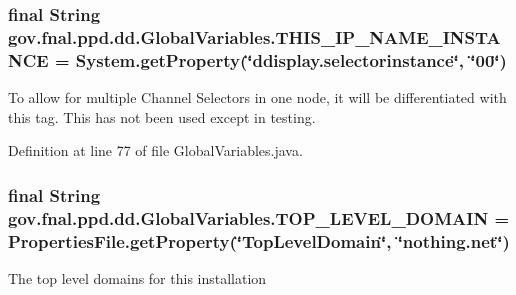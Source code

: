 \hypertarget{classgov_1_1fnal_1_1ppd_1_1dd_1_1GlobalVariables_ae5fe9c75fedaa742e5f68baad8768d7f}{
\subsubsection[{T\-H\-I\-S\-\_\-\-I\-P\-\_\-\-N\-A\-M\-E\-\_\-\-I\-N\-S\-T\-A\-N\-C\-E}]{\setlength{\rightskip}{0pt plus 5cm}final String gov.\-fnal.\-ppd.\-dd.\-Global\-Variables.\-T\-H\-I\-S\-\_\-\-I\-P\-\_\-\-N\-A\-M\-E\-\_\-\-I\-N\-S\-T\-A\-N\-C\-E = System.\-get\-Property(\char`\"{}ddisplay.\-selectorinstance\char`\"{}, \char`\"{}00\char`\"{})\hspace{0.3cm}{\ttfamily [static]}}}\label{classgov_1_1fnal_1_1ppd_1_1dd_1_1GlobalVariables_ae5fe9c75fedaa742e5f68baad8768d7f}
To allow for multiple Channel Selectors in one node, it will be differentiated with this tag. This has not been used except in testing. 

Definition at line 77 of file Global\-Variables.\-java.

\hypertarget{classgov_1_1fnal_1_1ppd_1_1dd_1_1GlobalVariables_ad0a782cf8410f087e2bacb776ff69ca1}{
\subsubsection[{T\-O\-P\-\_\-\-L\-E\-V\-E\-L\-\_\-\-D\-O\-M\-A\-I\-N}]{\setlength{\rightskip}{0pt plus 5cm}final String gov.\-fnal.\-ppd.\-dd.\-Global\-Variables.\-T\-O\-P\-\_\-\-L\-E\-V\-E\-L\-\_\-\-D\-O\-M\-A\-I\-N = {\bf Properties\-File.\-get\-Property}(\char`\"{}Top\-Level\-Domain\char`\"{}, \char`\"{}nothing.\-net\char`\"{})\hspace{0.3cm}{\ttfamily [static]}}}\label{classgov_1_1fnal_1_1ppd_1_1dd_1_1GlobalVariables_ad0a782cf8410f087e2bacb776ff69ca1}
The top level domains for this installation 

